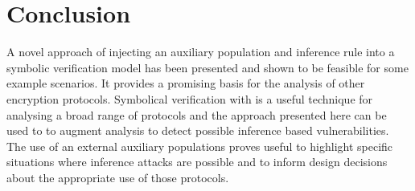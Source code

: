 \documentclass[journal]{IEEEtran}
\begin{document}



\section{Conclusion}
A novel approach of injecting an auxiliary population and inference rule into a symbolic verification model has been presented and shown to be feasible for some example scenarios. It provides a promising basis for the analysis of other encryption protocols.	Symbolical verification with \tamarin{} is a useful technique for analysing a broad range of protocols and the approach presented here can be used to to augment analysis to detect possible inference based vulnerabilities. The use of an external auxiliary populations proves useful to highlight specific situations where inference attacks are possible and to inform design decisions about the appropriate use of those protocols.



%
\end{document}
